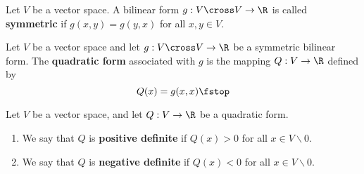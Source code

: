 \begin{definition}
  Let \( V \) be a vector space. A bilinear form \( g:V\cross V\to\R \) is called \textbf{symmetric} if \( g(x,y)=g(y,x) \) for all \( x,y\in V \).
\end{definition}

\begin{definition}
  Let \( V \) be a vector space and let \( g:V\cross V\to\R \) be a symmetric bilinear form. The \textbf{quadratic form} associated with \( g \) is the mapping \( Q:V\to\R \) defined by
  \[ Q(x)=g(x,x)\fstop \]
\end{definition}

\begin{definition}
  Let \( V \) be a vector space, and let \( Q:V\to\R \) be a quadratic form.
  \begin{enumerate}[label=(\alph*)]
  \item We say that \( Q \) is \textbf{positive definite} if \( Q(x)>0 \) for all \( x\in V\backslash\qty{0} \).
  \item We say that \( Q \) is \textbf{negative definite} if \( Q(x)<0 \) for all \( x\in V\backslash\qty{0} \).
  \end{enumerate}
\end{definition}

